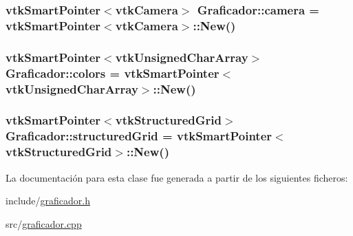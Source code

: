 \subsubsection[{\texorpdfstring{camera}{camera}}]{\setlength{\rightskip}{0pt plus 5cm}vtk\+Smart\+Pointer$<$vtk\+Camera$>$ Graficador\+::camera = vtk\+Smart\+Pointer$<$vtk\+Camera$>$\+::New()}\hypertarget{class_graficador_aeb158420087549f052e29a6739ea2f75}{}\label{class_graficador_aeb158420087549f052e29a6739ea2f75}
\subsubsection[{\texorpdfstring{colors}{colors}}]{\setlength{\rightskip}{0pt plus 5cm}vtk\+Smart\+Pointer$<$vtk\+Unsigned\+Char\+Array$>$ Graficador\+::colors = vtk\+Smart\+Pointer$<$vtk\+Unsigned\+Char\+Array$>$\+::New()}\hypertarget{class_graficador_a48b78d03ae2e04e5032ed685f8fd8643}{}\label{class_graficador_a48b78d03ae2e04e5032ed685f8fd8643}
\subsubsection[{\texorpdfstring{structured\+Grid}{structuredGrid}}]{\setlength{\rightskip}{0pt plus 5cm}vtk\+Smart\+Pointer$<$vtk\+Structured\+Grid$>$ Graficador\+::structured\+Grid = vtk\+Smart\+Pointer$<$vtk\+Structured\+Grid$>$\+::New()}\hypertarget{class_graficador_aeb8321dafc848939f900bea4721142da}{}\label{class_graficador_aeb8321dafc848939f900bea4721142da}


La documentación para esta clase fue generada a partir de los siguientes ficheros\+:\begin{DoxyCompactItemize}
\item 
include/\hyperlink{graficador_8h}{graficador.\+h}\item 
src/\hyperlink{graficador_8cpp}{graficador.\+cpp}\end{DoxyCompactItemize}
